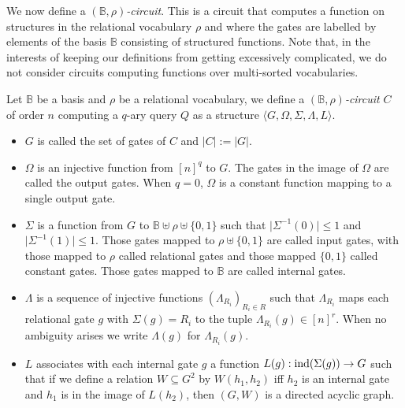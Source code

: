 \documentclass[../paper.tex]{subfiles}
\begin{document}



We now define a \emph{$(\mathbb{B}, \rho)$-circuit}. This is a circuit that
computes a function on structures in the relational vocabulary $\rho$ and where
the gates are labelled by elements of the basis $\mathbb{B}$ consisting of
structured functions. Note that, in the interests of keeping our definitions
from getting excessively complicated, we do not consider circuits computing
functions over multi-sorted vocabularies.

\begin{definition}
  Let $\mathbb{B}$ be a basis and $\rho$ be a relational vocabulary, we define a
  \emph{$(\mathbb{B}, \rho)$-circuit} $C$ of order $n$ computing a $q$-ary query
  $Q$ as a structure $\langle G, \Omega, \Sigma, \Lambda, L \rangle$.
  \begin{itemize}
    \setlength\itemsep{0mm}
  \item $G$ is called the set of gates of $C$ and $\vert C \vert := \vert G
    \vert$.
  \item $\Omega$ is an injective function from $[n]^q$ to $G$. The gates in the
    image of $\Omega$ are called the output gates. When $q = 0$, $\Omega$ is a
    constant function mapping to a single output gate.
  \item $\Sigma$ is a function from $G$ to $\mathbb{B} \uplus \rho \uplus
    \{0,1\} $ such that $\vert \Sigma^{-1} (0) \vert \leq 1$ and $\vert
    \Sigma^{-1} (1) \vert \leq 1$. Those gates mapped to $\rho \uplus \{0,1\}$
    are called input gates, with those mapped to $\rho$ called relational gates
    and those mapped $\{0,1\}$ called constant gates. Those gates mapped to
    $\mathbb{B}$ are called internal gates.
  \item $\Lambda$ is a sequence of injective functions $(\Lambda_{R_i})_{R_i \in
      R}$ such that $\Lambda_{R_i}$ maps each relational gate $g$ with $\Sigma
    (g) = R_i$ to the tuple $\Lambda_{R_i} (g) \in [n]^{r}$. When no ambiguity
    arises we write $\Lambda (g)$ for $\Lambda_{R_i} (g)$.
  \item $L$ associates with each internal gate $g$ a function $L(g):
    \text{\upshape ind}(\Sigma(g)) \rightarrow G$ such that if we define a relation $W
    \subseteq G^{2}$ by $W(h_1,h_2)$ iff $h_2$ is an internal gate and $h_1$ is
    in the image of $L(h_2)$, then $(G, W)$ is a directed acyclic graph.
  \end{itemize}
\end{definition}
\end{document}
